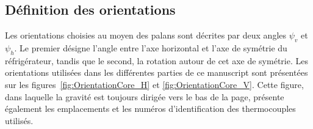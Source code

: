 \subsection{Définition des orientations}

Les orientations choisies au moyen des palans sont décrites par deux angles $\psi_v$ et $\psi_h$. Le premier désigne l'angle entre l'axe horizontal et l'axe de symétrie du réfrigérateur, tandis que le second, la rotation autour de cet axe de symétrie. Les orientations utilisées dans les différentes parties de ce manuscript sont présentées sur les figures~\ref{fig:OrientationCore_H} et \ref{fig:OrientationCore_V}. Cette figure, dans laquelle la gravité est toujours dirigée vers le bas de la page, présente également les emplacements et les numéros d'identification des thermocouples utilisés.\medskip

